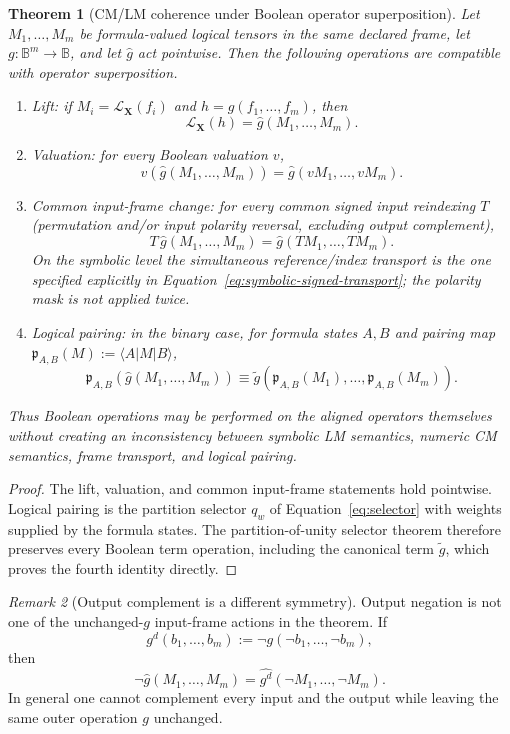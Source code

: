\documentclass[11pt]{article}
\newtheorem{theorem}{Theorem}[section]
\theoremstyle{definition}
\theoremstyle{remark}
\newtheorem{remark}[theorem]{Remark}
\newcommand{\B}{\mathbb B}
\begin{document}
\begin{theorem}[CM/LM coherence under Boolean operator superposition]
\label{thm:coherence}
Let $M_1,\ldots,M_m$ be formula-valued logical tensors in the same declared frame, let $g:\B^m\to\B$, and let $\widehat g$ act pointwise.  Then the following operations are compatible with operator superposition.
\begin{enumerate}
\item \emph{Lift:} if $M_i=\mathcal L_{\mathbf X}(f_i)$ and $h=g(f_1,\ldots,f_m)$, then
\[
 \mathcal L_{\mathbf X}(h)=\widehat g(M_1,\ldots,M_m).
\]
\item \emph{Valuation:} for every Boolean valuation $v$,
\[
 v\!\left(\widehat g(M_1,\ldots,M_m)\right)
 =\widehat g(vM_1,\ldots,vM_m).
\]
\item \emph{Common input-frame change:} for every common signed input reindexing $T$ (permutation and/or input polarity reversal, excluding output complement),
\[
 T\,\widehat g(M_1,\ldots,M_m)
 =\widehat g(TM_1,\ldots,TM_m).
\]
On the symbolic level the simultaneous reference/index transport is the one specified explicitly in Equation~\eqref{eq:symbolic-signed-transport}; the polarity mask is not applied twice.
\item \emph{Logical pairing:} in the binary case, for formula states $A,B$ and pairing map $\mathfrak p_{A,B}(M):=\langle A|M|B\rangle$,
\[
 \mathfrak p_{A,B}\!\left(\widehat g(M_1,\ldots,M_m)\right)
 \equiv
 \widetilde g\!\left(\mathfrak p_{A,B}(M_1),\ldots,\mathfrak p_{A,B}(M_m)\right).
\]
\end{enumerate}
Thus Boolean operations may be performed on the aligned operators themselves without creating an inconsistency between symbolic LM semantics, numeric CM semantics, frame transport, and logical pairing.
\end{theorem}
\begin{proof}
The lift, valuation, and common input-frame statements hold pointwise.  Logical pairing is the partition selector $q_w$ of Equation~\eqref{eq:selector} with weights supplied by the formula states.  The partition-of-unity selector theorem therefore preserves every Boolean term operation, including the canonical term $\widetilde g$, which proves the fourth identity directly.
\end{proof}

\begin{remark}[Output complement is a different symmetry]
Output negation is not one of the unchanged-$g$ input-frame actions in the theorem.  If
\[
 g^d(b_1,\ldots,b_m):=\neg g(\neg b_1,\ldots,\neg b_m),
\]
then
\[
 \neg\widehat g(M_1,\ldots,M_m)
 =\widehat{g^d}(\neg M_1,\ldots,\neg M_m).
\]
In general one cannot complement every input and the output while leaving the same outer operation $g$ unchanged.
\end{remark}
\end{document}
